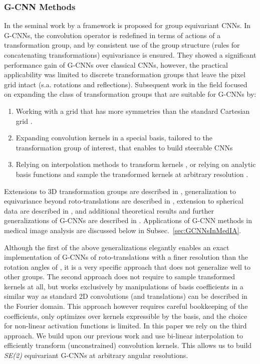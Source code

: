 \documentclass[twocolumn,final]{article}
\newcommand{\se}[1]{\textit{SE(#1)}}
\begin{document}
\subsubsection{G-CNN Methods}
In the seminal work by \citet{cohen2016group} a framework is proposed for group equivariant CNNs. In G-CNNs, the convolution operator is redefined in terms of actions of a transformation group, and by consistent use of the group structure (rules for concatenating transformations) equivariance is ensured. They showed a significant performance gain of G-CNNs over classical CNNs, however, the practical applicability was limited to discrete transformation groups that leave the pixel grid intact (s.a.  rotations and reflections). Subsequent work in the field focused on expanding the class of transformation groups that are suitable for G-CNNs by:
\begin{enumerate}
\item Working with a grid that has more symmetries than the standard Cartesian grid \citep{hoogeboom2018hexaconv}.
\item Expanding convolution kernels in a special basis, tailored to the transformation group of interest, that enables to build steerable CNNs \citep{worrall2017harmonic}
\item Relying on interpolation methods to transform kernels \cite{bekkers2018roto}, or relying on analytic basis functions and sample the transformed kernels at arbitrary resolution \citep{weiler2017learning,bekkers2018template}.
\end{enumerate}
Extensions to 3D transformation groups are described in \citep{worrall2018cubenet,winkels2019nodule,weiler20183d,andrearczyk2019pulmonary}, generalization to equivariance beyond roto-translations are described in \citep{bekkers_b-spline_2019,worrall_deep_2019}, extension to spherical data are described in  \citep{cohen2018spherical,kondor_generalization_2018,thomas_tensor_2018,esteves_learning_2018}, and additional theoretical results and further generalizations of G-CNNs are described in \citep{cohen_general_2018,kondor_generalization_2018,cohen2019gauge}.
Applications of G-CNN methods in medical image analysis are discussed below in Subsec.~\ref{sec:GCNNsInMedIA}. 

Although the first of the above generalizations elegantly enables an exact implementation of G-CNNs of roto-translations with a finer resolution than the  rotation angles of \citep{cohen2016group}, it is a very specific approach that does not generalize well to other groups. The second approach does not require to sample transformed kernels at all, but works exclusively by manipulations of basis coefficients in a similar way as standard 2D convolutions (and translations) can be described in the Fourier domain. This approach however requires careful bookkeeping of the coefficients, only optimizes over kernels expressible by the basis, and the choice for non-linear activation functions is limited. In this paper we rely on the third approach. We build upon our previous work \citep{bekkers2018roto} and use bi-linear interpolation to efficiently transform (unconstrained) convolution kernels. This allows us to build \se{2} equivariant G-CNNs at arbitrary angular resolutions.
\end{document}
